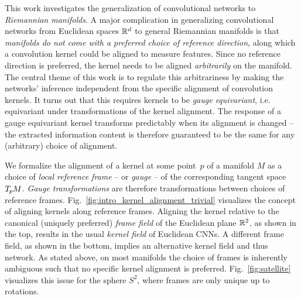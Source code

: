 This work investigates the generalization of convolutional networks to \emph{Riemannian manifolds}.
A major complication in generalizing convolutional networks from Euclidean spaces $\mathbb{R}^d$ to general Riemannian manifolds is that \emph{manifolds do not come with a preferred choice of reference direction}, along which a convolution kernel could be aligned to measure features.
Since no reference direction is preferred, the kernel needs to be aligned \emph{arbitrarily} on the manifold.
The central theme of this work is to regulate this arbitrariness by making the networks' inference independent from the specific alignment of convolution kernels.
It turns out that this requires kernels to be \emph{gauge equivariant}, i.e. equivariant under transformations of the kernel alignment.
The response of a gauge equivariant kernel transforms predictably when its alignment is changed
-- the extracted information content is therefore guaranteed to be the same for any (arbitrary) choice of alignment.


We formalize the alignment of a kernel at some point~$p$ of a manifold $M$ as a choice of \emph{local reference frame} -- or \emph{gauge} -- of the corresponding tangent space $T_{\mkern-1.5mu p}\mkern-.5muM$.
\emph{Gauge transformations} are therefore transformations between choices of reference frames.
Fig.~\ref{fig:intro_kernel_alignment_trivial} visualizes the concept of aligning kernels along reference frames.
Aligning the kernel relative to the canonical (uniquely preferred) \emph{frame field} of the Euclidean plane $\mathbb{R}^2$, as shown in the top, results in the usual \emph{kernel field} of Euclidean CNNs.
A different frame field, as shown in the bottom, implies an alternative kernel field and thus network.
As stated above, on most manifolds the choice of frames is inherently ambiguous such that no specific kernel alignment is preferred.
Fig.~\ref{fig:satellite} visualizes this issue for the sphere $S^2$, where frames are only unique up to rotations.


